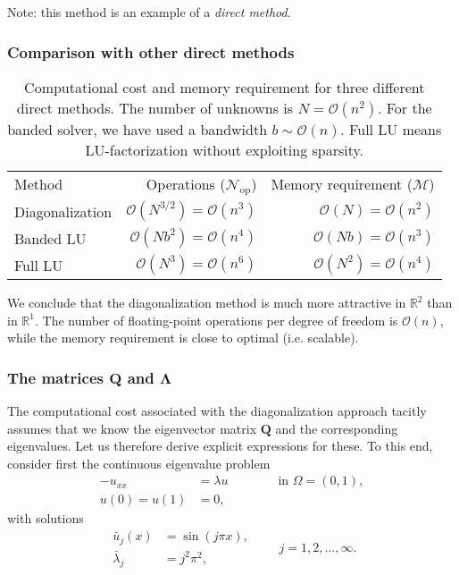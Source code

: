 Note: this method is an example of a {\em direct method}.

\subsubsection{Comparison with other direct methods}

\begin{table}
    \caption{
      Computational cost and memory requirement for three different
      direct methods. The number of unknowns is $N=\mathcal{O}(n^2)$. For the
      banded solver, we have used a bandwidth $b \sim \mathcal{O}(n)$. Full LU
      means LU-factorization without exploiting sparsity.
    }
    \label{tab:DirectMethods_ComputationalCost}
  \begin{center}
    \bgroup{}
    \begin{tabular}{lrr}
      \hline
      Method & Operations ($\mathcal{N}_\text{op}$) & Memory requirement ($\mathcal{M}$) \\
      \hhline{===}
      Diagonalization & $\mathcal{O}(N^{3/2}) = \mathcal{O}(n^3)$ & $\mathcal{O}(N) = \mathcal{O}(n^2)$ \\
      Banded LU & $\mathcal{O}(N b^2) = \mathcal{O}(n^4)$ & $\mathcal{O}(Nb) = \mathcal{O}(n^3)$ \\
      Full LU & $\mathcal{O}(N^3) = \mathcal{O}(n^6)$ & $\mathcal{O}(N^2) = \mathcal{O}(n^4)$ \\
      \hline
    \end{tabular}
    \egroup
  \end{center}
\end{table}

We conclude that the diagonalization method is much more attractive in
$\mathbb{R}^2$ than in $\mathbb{R}^1$. The number of floating-point operations
per degree of freedom is $\mathcal{O}(n)$, while the memory requirement is close
to optimal (i.e. scalable).

\subsubsection{The matrices $\bm Q$ and $\bm \Lambda$}

The computational cost associated with the diagonalization approach tacitly
assumes that we know the eigenvector matrix $\bm Q$ and the corresponding
eigenvalues. Let us therefore derive explicit expressions for these. To this
end, consider first the continuous eigenvalue problem
\begin{equation*}
  \begin{split}
    -u_{xx} &= \lambda u \qquad \qquad \text{in } \Omega=(0,1), \\
    u(0) = u(1) &= 0,
  \end{split}
\end{equation*}
with solutions
\begin{equation*}
  \begin{split}
    \bar{u}_j(x) &= \sin(j \pi x), \\
    \bar{\lambda}_j &= j^2 \pi^2,
  \end{split}
  \qquad j=1,2,\ldots,\infty.
\end{equation*}

